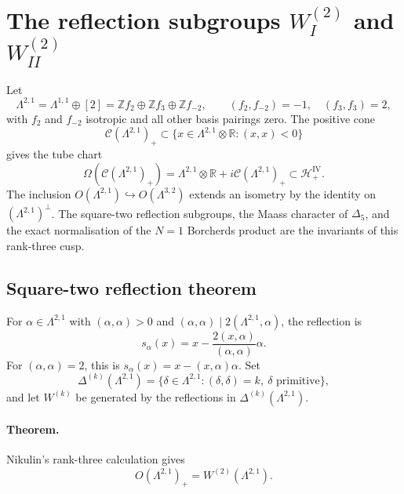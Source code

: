 \providecommand{\Z}{\mathbb{Z}}
\providecommand{\R}{\mathbb{R}}
\providecommand{\C}{\mathbb{C}}
\providecommand{\Lat}{\Lambda}
\providecommand{\cC}{\mathcal{C}}
\providecommand{\cP}{\mathcal{P}}
\providecommand{\cH}{\mathcal{H}}
\providecommand{\cO}{\mathcal{O}}
\providecommand{\fhp}{\mathcal{H}_+^{\mathrm{IV}}}
\providecommand{\Dfive}{\Delta_{5}}
\providecommand{\PhiTenOP}{\Phi_{\!10}^{\mathrm{OP}}}
\providecommand{\Zgeq}{\mathbb{Z}_{\geq 0}}
\providecommand{\BKM}{\mathrm{BKM}}
\providecommand{\CoHA}{\mathrm{CoHA}}
\providecommand{\kch}{\kappa_{\mathrm{ch}}}
\providecommand{\kcat}{\kappa_{\mathrm{cat}}}
\providecommand{\kBKM}{\kappa_{\mathrm{BKM}}}
\providecommand{\kfib}{\kappa_{\mathrm{fiber}}}
\providecommand{\Eone}{E_1}
\providecommand{\Etwo}{E_2}

\section*{The reflection subgroups
\texorpdfstring{$W_I^{(2)}$}{W-I-2} and
\texorpdfstring{$W_{II}^{(2)}$}{W-II-2}}

Let
\[
  \Lat^{2,1}
  = \Lat^{1,1}\oplus[2]
  = \Z f_2 \oplus \Z f_3 \oplus \Z f_{-2},
  \qquad
  (f_2,f_{-2})=-1,\quad (f_3,f_3)=2,
\]
with $f_2$ and $f_{-2}$ isotropic and all other basis pairings zero.
The positive cone
\[
  \cC(\Lat^{2,1})_+
  \subset \{x\in \Lat^{2,1}\otimes\R : (x,x)<0\}
\]
gives the tube chart
\[
  \Omega(\cC(\Lat^{2,1})_+)
  = \Lat^{2,1}\otimes\R+i\cC(\Lat^{2,1})_+
  \subset \fhp .
\]
The inclusion $O(\Lat^{2,1})\hookrightarrow O(\Lat^{3,2})$ extends an
isometry by the identity on $(\Lat^{2,1})^\perp$. The square-two
reflection subgroups, the Maass character of $\Dfive$, and the exact
normalisation of the $N=1$ Borcherds product are the invariants of this
rank-three cusp.

\subsection*{Square-two reflection theorem}

For $\alpha\in\Lat^{2,1}$ with $(\alpha,\alpha)>0$ and
$(\alpha,\alpha)\mid 2(\Lat^{2,1},\alpha)$, the reflection is
\[
  s_\alpha(x)
  =x-\frac{2(x,\alpha)}{(\alpha,\alpha)}\alpha .
\]
For $(\alpha,\alpha)=2$, this is $s_\alpha(x)=x-(x,\alpha)\alpha$.
Set
\[
  \Delta^{(k)}(\Lat^{2,1})
  =\{\delta\in\Lat^{2,1}:(\delta,\delta)=k,\ \delta
  \text{ primitive}\},
\]
and let $W^{(k)}$ be generated by the reflections in
$\Delta^{(k)}(\Lat^{2,1})$.

\paragraph{Theorem.}
Nikulin's rank-three calculation gives
\[
  O(\Lat^{2,1})_+=W^{(2)}(\Lat^{2,1}).
\]

